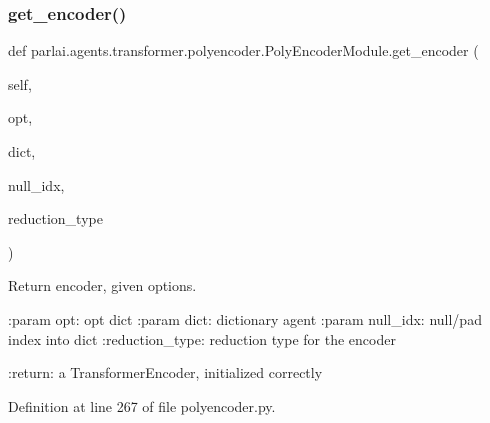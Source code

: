 \mbox{\label{classparlai_1_1agents_1_1transformer_1_1polyencoder_1_1PolyEncoderModule_acd213717123d2f2f24e6f03270c3db14}} 
\subsubsection{\texorpdfstring{get\+\_\+encoder()}{get\_encoder()}}
{\footnotesize\ttfamily def parlai.\+agents.\+transformer.\+polyencoder.\+Poly\+Encoder\+Module.\+get\+\_\+encoder (\begin{DoxyParamCaption}\item[{}]{self,  }\item[{}]{opt,  }\item[{}]{dict,  }\item[{}]{null\+\_\+idx,  }\item[{}]{reduction\+\_\+type }\end{DoxyParamCaption})}

\begin{DoxyVerb}Return encoder, given options.

:param opt:
    opt dict
:param dict:
    dictionary agent
:param null_idx:
    null/pad index into dict
:reduction_type:
    reduction type for the encoder

:return:
    a TransformerEncoder, initialized correctly
\end{DoxyVerb}
 

Definition at line 267 of file polyencoder.\+py.


